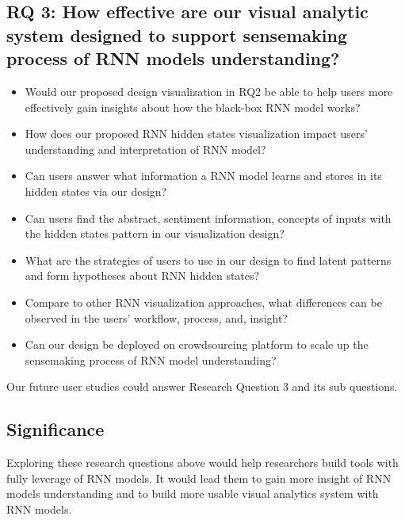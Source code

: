 
\subsection{RQ 3: How effective are our visual analytic system designed to support sensemaking process of RNN models understanding? }

\begin{itemize}
    \item Would our proposed design visualization in RQ2 be able to help users more effectively gain insights about how the black-box RNN model works? 
    \item How does our proposed RNN hidden states visualization impact users’ understanding and interpretation of RNN model?
    \item Can users answer what information a RNN model learns and stores in its hidden states via our design?
    \item Can users find the abstract, sentiment information, concepts of inputs with the hidden states pattern in our visualization design?
    \item What are the strategies of users to use in our design to find latent patterns and form hypotheses about RNN hidden states?
    \item Compare to other RNN visualization approaches\cite{Strobelt2016}, what differences can be observed in the users’ workflow, process, and, insight?
    \item Can our design be deployed on crowdsourcing platform to scale up the sensemaking process of RNN model understanding?

\end{itemize}

Our future user studies could answer Research Question 3 and its sub questions. 

\subsection{Significance}


Exploring these research questions above would help researchers build tools with fully leverage of RNN models. It would lead them to gain more insight of RNN models understanding and to build more usable visual analytics system with RNN models. 

